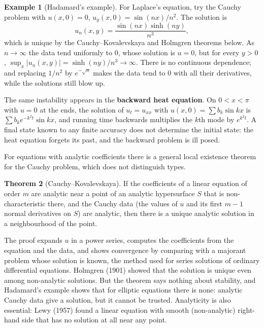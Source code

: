 \documentclass[11pt,a4paper]{article}
\numberwithin{equation}{section}
\theoremstyle{definition}
\newtheorem{thm}{Theorem}[subsection]
\newtheorem{exa}[thm]{Example}
\begin{document}
\begin{exa}[Hadamard's example]
\label{ex:hadamard}
For Laplace's equation, try the Cauchy problem with $u(x, 0) = 0$, $u_y(x, 0) = \sin(nx)/n^2$. The solution is
\[
u_n(x, y) = \frac{\sin(nx)\sinh(ny)}{n^3} ,
\]
which is unique by the Cauchy--Kovalevskaya and Holmgren theorems below. As $n \to \infty$ the data tend uniformly to $0$, whose solution is $u = 0$, but for every $y > 0$, $\sup_x|u_n(x, y)| = \sinh(ny)/n^3 \to \infty$. There is no continuous dependence; and replacing $1/n^2$ by $e^{-\sqrt n}$ makes the data tend to $0$ with all their
derivatives, while the solutions still blow up.
\end{exa}

The same instability appears in the \textbf{backward heat equation}. On $0 < x < \pi$ with $u = 0$ at the ends, the solution of $u_t = u_{xx}$ with $u(x, 0) = \sum b_k\sin kx$ is $\sum b_ke^{-k^2t}\sin kx$, and running time backwards multiplies the $k$th mode by $e^{k^2t}$. A final
state known to any finite accuracy does not determine the initial state: the heat equation forgets its past, and the backward problem is ill posed.

For equations with analytic coefficients there is a general local existence theorem for the Cauchy problem, which does not distinguish types.

\begin{thm}[Cauchy--Kovalevskaya]
\label{thm:ck}
If the coefficients of a linear equation of order $m$ are analytic near a point of an analytic hypersurface $S$ that is non-characteristic there, and the Cauchy data (the values of $u$ and its first $m - 1$ normal derivatives on $S$) are analytic, then there is a unique analytic solution in a neighbourhood
of the point.
\end{thm}

The proof expands $u$ in a power series, computes the coefficients from the equation and the data, and shows convergence by comparing with a majorant problem whose solution is known, the method used for series solutions of ordinary differential equations. Holmgren (1901) showed that the solution is
unique even among non-analytic solutions. But the theorem says nothing about stability, and Hadamard's example shows that for elliptic equations there is none: analytic Cauchy data give a solution, but it cannot be trusted. Analyticity is also essential:
Lewy (1957) found a linear equation with smooth (non-analytic) right-hand side that has no solution at all near any point.
\end{document}
